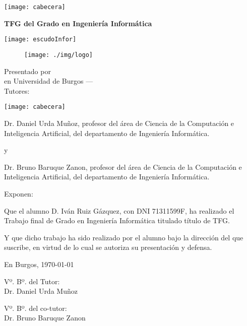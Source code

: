 \documentclass[a4paper,12pt,twoside]{memoir}
\title{\titulo}
\author{\nombre}
\date{\today}
\makeatletter
\def\maketitle{
  \thispagestyle{empty}
  \noindent\texttt{[image: cabecera]}\vspace{1cm}%


  \colorbox{cpardoBox}{%
    \begin{minipage}{.8\textwidth}
      \vspace{.5cm}\Large
      \begin{center}
      \textbf{TFG del Grado en Ingeniería Informática}\vspace{.6cm}\\
      \textbf{\LARGE\@title{}}
      \end{center}
      \vspace{.2cm}
    \end{minipage}

  }%
  \hfill\begin{minipage}{.20\textwidth}
    \texttt{[image: escudoInfor]}
  \end{minipage}

  \begin{figure}[h!]
    \centering
    \texttt{[image: ./img/logo]}
  \end{figure}
  
  \begin{center}%
  {%
    \noindent\LARGE
    Presentado por \@author{}\\ 
    en Universidad de Burgos --- \@date{}\\
    Tutores: \@tutor{}\\
  }%
  \end{center}%
  \null
  \cleardoublepage
  }
\newcommand{\nombre}{Iván Ruiz Gázquez}
\newcommand{\dni}{71311599F}
\makeatother
\begin{document}
\maketitle

\cleardoublepage

\thispagestyle{empty}

\noindent\texttt{[image: cabecera]}\vspace{1cm}

\noindent Dr. Daniel Urda Muñoz, profesor del área de Ciencia de la Computación e Inteligencia Artificial, del departamento de Ingeniería Informática.

y

\noindent Dr. Bruno Baruque Zanon, profesor del área de Ciencia de la Computación e Inteligencia Artificial, del departamento de Ingeniería Informática.

\noindent Exponen:

\noindent Que el alumno D. \nombre, con DNI \dni, ha realizado el Trabajo final de Grado en Ingeniería Informática titulado título de TFG.

\noindent Y que dicho trabajo ha sido realizado por el alumno bajo la dirección del que suscribe, en virtud de lo cual se autoriza su presentación y defensa.

\begin{center} %
  En Burgos, {\large \today}
\end{center}

\vfill\vfill\vfill

\begin{minipage}{0.45\textwidth}
  \begin{flushleft} %
    Vº. Bº. del Tutor:\\[2cm]
    Dr. Daniel Urda Muñoz
  \end{flushleft}
\end{minipage}
\hfill
\begin{minipage}{0.45\textwidth}
  \begin{flushleft} %
    Vº. Bº. del co-tutor:\\[2cm]
    Dr. Bruno Baruque Zanon
  \end{flushleft}
\end{minipage}
\hfill

\vfill

\end{document}
